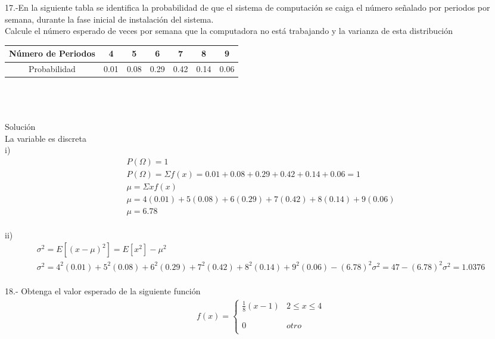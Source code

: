 \documentclass{article}
\begin{document}
\section*{}
17.-En la siguiente tabla se identifica la probabilidad de que el sistema de computación se caiga el número señalado por periodos por semana, durante la fase inicial de instalación del sistema.\\
Calcule el número esperado de veces por semana que la computadora no está trabajando y la varianza de esta distribución\\
\begin{tabular}{|c|c|c|c|c|c|c|}
\hline 
Número de Periodos  & 4 & 5 & 6 & 7 & 8 & 9 \\ 
\hline 
Probabilidad & 0.01 & 0.08 & 0.29 & 0.42 & 0.14 & 0.06 \\ 
\hline 
\end{tabular} \\\\\\
Solución\\
La variable es discreta\\
i)
\begin{gather*}
	P(\Omega) = 1\\
	P(\Omega) = \Sigma f(x) = 0.01 + 0.08 + 0.29 + 0.42 + 0.14 + 0.06 = 1\\
	\mu = \Sigma xf(x)\\
	\mu = 4(0.01) + 5(0.08) + 6(0.29) + 7(0.42) + 8(0.14) + 9(0.06)\\
	\mu = 6.78	
\end{gather*}\\
ii)
\begin{gather*}
	\sigma^2 = E[(x - \mu)^2] = E[x^2] - \mu ^2\\
	\sigma^2 = 4^2(0.01) + 5^2(0.08) + 6^2(0.29) + 7^2(0.42) + 8^2(0.14) + 9^2(0.06) - (6.78)^2
	\sigma^2 = 47 - (6.78)^2
	\sigma^2 = 1.0376
\end{gather*}\\
18.- Obtenga el valor esperado de la siguiente función\\
\begin{gather*}
f(x)= \left\{ \begin{array}{lcc}
             \frac{1}{8}(x - 1) & 2 \leq x \leq 4 \\\\
             \\0  & otro \\
             \end{array}
   \right.
\end{gather*}\\
\end{document}
